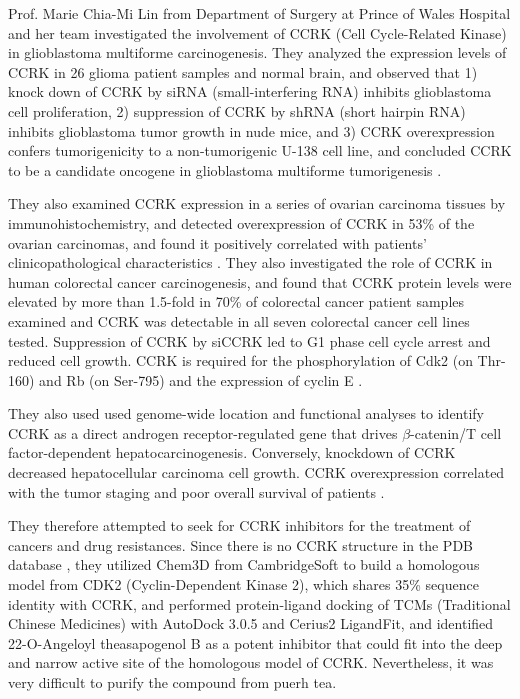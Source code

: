 Prof. Marie Chia-Mi Lin from Department of Surgery at Prince of Wales Hospital and her team investigated the involvement of CCRK (Cell Cycle-Related Kinase) in glioblastoma multiforme carcinogenesis. They analyzed the expression levels of CCRK in 26 glioma patient samples and normal brain, and observed that 1) knock down of CCRK by siRNA (small-interfering RNA) inhibits glioblastoma cell proliferation, 2) suppression of CCRK by shRNA (short hairpin RNA) inhibits glioblastoma tumor growth in nude mice, and 3) CCRK overexpression confers tumorigenicity to a non-tumorigenic U-138 cell line, and concluded CCRK to be a candidate oncogene in glioblastoma multiforme tumorigenesis \citep{1144}.

They also examined CCRK expression in a series of ovarian carcinoma tissues by immunohistochemistry, and detected overexpression of CCRK in 53\% of the ovarian carcinomas, and found it positively correlated with patients' clinicopathological characteristics \citep{1145}. They also investigated the role of CCRK in human colorectal cancer carcinogenesis, and found that CCRK protein levels were elevated by more than 1.5-fold in 70\% of colorectal cancer patient samples examined and CCRK was detectable in all seven colorectal cancer cell lines tested. Suppression of CCRK by siCCRK led to G1 phase cell cycle arrest and reduced cell growth. CCRK is required for the phosphorylation of Cdk2 (on Thr-160) and Rb (on Ser-795) and the expression of cyclin E \citep{1143}. 

They also used used genome-wide location and functional analyses to identify CCRK as a direct androgen receptor-regulated gene that drives $\beta$-catenin/T cell factor-dependent hepatocarcinogenesis. Conversely, knockdown of CCRK decreased hepatocellular carcinoma cell growth. CCRK overexpression correlated with the tumor staging and poor overall survival of patients \citep{1146}.

They therefore attempted to seek for CCRK inhibitors for the treatment of cancers and drug resistances. Since there is no CCRK structure in the PDB database \citep{540,537}, they utilized Chem3D from CambridgeSoft to build a homologous model from CDK2 (Cyclin-Dependent Kinase 2), which shares 35\% sequence identity with CCRK, and performed protein-ligand docking of TCMs (Traditional Chinese Medicines) with AutoDock 3.0.5 and Cerius2 LigandFit, and identified 22-O-Angeloyl theasapogenol B as a potent inhibitor that could fit into the deep and narrow active site of the homologous model of CCRK. Nevertheless, it was very difficult to purify the compound from puerh tea.

